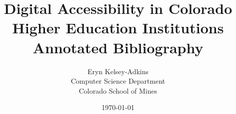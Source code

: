 \documentclass{article}
\title{Digital Accessibility in Colorado Higher Education Institutions \\\medskip Annotated Bibliography}
\author{Eryn Kelsey-Adkins\\Computer Science Department\\Colorado School of Mines}
\date{\today}
\begin{document}
\maketitle

\nocite{*}

\printbibliography
\end{document}
